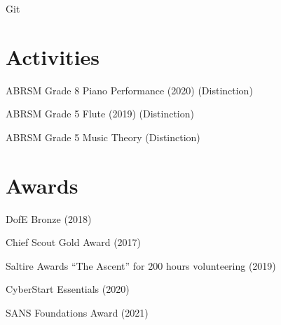 \documentclass[]{hieudo-build}
\begin{document}
\begin{minipage}[t]{0.36\textwidth}
Git \\
\minisectionsep

\section{Activities}

ABRSM Grade 8 Piano Performance (2020) (Distinction) \\
\minisectionsep

ABRSM Grade 5 Flute (2019) (Distinction) \\
\minisectionsep

ABRSM Grade 5 Music Theory (Distinction)\\
\minisectionsep


\section{Awards} 
DofE Bronze (2018) \\
\minisectionsep

Chief Scout Gold Award (2017) \\
\minisectionsep

Saltire Awards “The Ascent” for 200 hours volunteering (2019) \\
\minisectionsep

CyberStart Essentials (2020) \\
\minisectionsep

SANS Foundations Award (2021) \\

\sectionsep
{}

%
%
\end{minipage} 
\hfill
\end{document}
